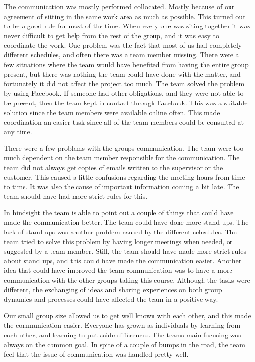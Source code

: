 The communication was mostly performed collocated. Mostly because of our agreement of sitting in the same work area as much as possible. This turned out to be a good rule for most of the time. 
When every one was siting together it was never difficult to get help from the rest of the group, and it was easy to coordinate the work. One problem was the fact that most of us had completely different schedules, and often there was a team member missing. There were a few situations where the team would have benefited from having the entire group present, but there was nothing the team could have done with the matter, and fortunately it did not affect the project too much. The team solved the problem by using Facebook. If someone had other obligations, and they were not able to be present, then the team kept in contact through Facebook. This was a suitable solution since the team members were available online often. This made coordination an easier task since all of the team members could be consulted at any time. 

There were a few problems with the groups communication. The team were too much dependent on the team member responsible for the communication. The team did not always get copies of emails written to the supervisor or the customer. This caused a little confusions regarding the meeting hours from time to time. It was also the cause of important information coming a bit late. The team should have had more strict rules for this.

In hindsight the team is able to point out a couple of things that could have made the communication better. The team could have done more stand ups. The lack of stand ups was another problem caused by the different schedules. The team tried to solve this problem by having longer meetings when needed, or suggested by a team member. Still, the team should have made more strict rules about stand ups, and this could have made the communication easier.
Another idea that could have improved the team communication was to have a more communication with the other groups taking this course. Although the tasks were different, the exchanging of ideas and sharing experiences on both group dynamics and processes could have affected the team in a positive way. 

Our small group size allowed us to get well known with each other, and this made the communication easier.
Everyone has grown as individuals by learning from each other, and learning to put aside differences. The teams main focusing was always on the common goal. In spite of a couple of bumps in the road, the team feel that the issue of communication was handled pretty well.


